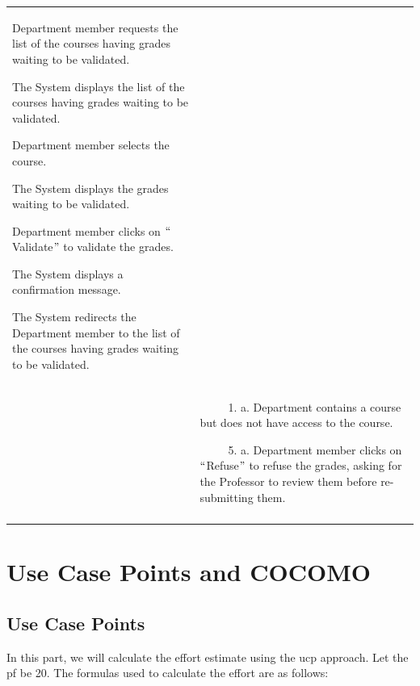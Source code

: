 \documentclass[11pt]{article}
\begin{document}
\begin{table}[H]
\begin{tabular}{p{1.23in}p{4.87in}}
\multicolumn{1}{|p{4.87in}|}{\begin{ucmenum}
	\item Department member requests the list of the courses having grades waiting to be validated. \par 	\item The System displays the list of the courses having grades waiting to be validated. \par 	\item Department member selects the course. \par 	\item The System displays the grades waiting to be validated. \par 	\item Department member clicks on $``$Validate$"$  to validate the grades. \par 	\item The System displays a confirmation message. \par 	\item The System redirects the Department member to the list of the courses having grades waiting to be validated.
\end{ucmenum}} \\
\hhline{--}
\multicolumn{1}{|p{1.23in}}{Alternate Flow} & 
\multicolumn{1}{|p{4.87in}|}{\ \ \ \ \  1. a. Department contains a course but does not have access to the course. \par \ \ \ \ \  5. a. Department member clicks on $``$Refuse$"$  to refuse the grades, asking for the Professor to review them before re-submitting them.} \\
\hhline{--}

\end{tabular}
 \end{table}

\newpage

\section{Use Case Points and COCOMO}

\subsection{Use Case Points}

In this part, we will calculate the effort estimate using the \gls{ucp} approach. Let the \gls{pf} be 20. The formulas used to calculate the effort are as follows:
\end{document}
